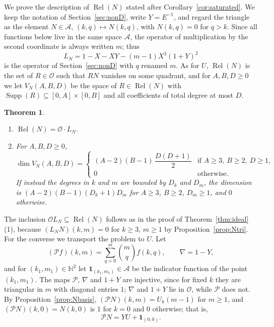 \documentclass[11pt]{amsart}
\newtheorem{theorem}{Theorem}[section]
\theoremstyle{definition}
\newcommand{\NN}{\mathbb{N}}
\newcommand{\cO}{\mathcal{O}}
\DeclareMathOperator{\Rel}{Rel}
\DeclareMathOperator{\Supp}{Supp}
\begin{document}
We prove the description of $\Rel(N)$ stated after Corollary~\ref{cor:saturated}. We keep the notation of Section~\ref{sec:nonD}, write $Y=E^{-1}$, and regard the triangle as the element $N\in\mathcal A$, $(k,q)\mapsto N(k,q)$, with $N(k,q)=0$ for $q>k$. Since all functions below live in the same space $\mathcal A$, the operator of multiplication by the second coordinate is always written $m$; thus
\[
  L_N=1-X-XY-(m-1)X^3(1+Y)^2
\]
is the operator of Section~\ref{sec:nonD} with $q$ renamed $m$. As for $U$, $\Rel(N)$ is the set of $R\in\cO$ such that $RN$ vanishes on some quadrant, and for $A,B,D\ge0$ we let $V_N(A,B,D)$ be the space of $R\in\Rel(N)$ with $\Supp(R)\subseteq[0,A]\times[0,B]$ and all coefficients of total degree at most $D$.

\begin{theorem}\label{thm:relN}\leavevmode
\begin{enumerate}
\item $\Rel(N)=\cO\cdot L_N$.
\item For $A,B,D\ge0$,
\[
  \dim V_N(A,B,D)=\begin{cases}(A-2)(B-1)\,\dfrac{D(D+1)}{2}&\text{if }A\ge3,\ B\ge2,\ D\ge1,\\[1ex] 0&\text{otherwise.}\end{cases}
\]
If instead the degrees in $k$ and $m$ are bounded by $D_k$ and $D_m$, the dimension is $(A-2)(B-1)(D_k+1)D_m$ for $A\ge3$, $B\ge2$, $D_m\ge1$, and $0$ otherwise.
\end{enumerate}
\end{theorem}

The inclusion $\cO L_N\subseteq\Rel(N)$ follows as in the proof of Theorem~\ref{thm:ideal}(1), because $(L_NN)(k,m)=0$ for $k\ge3$, $m\ge1$ by Proposition~\ref{prop:Ntri}. For the converse we transport the problem to $U$. Let
\[
  (\mathcal Pf)(k,m)=\sum_{q=0}^{m}\binom{m}{q}f(k,q),\qquad \nabla=1-Y,
\]
and for $(k_1,m_1)\in\NN^2$ let $\mathbf 1_{(k_1,m_1)}\in\mathcal A$ be the indicator function of the point $(k_1,m_1)$. The maps $\mathcal P$, $\nabla$ and $1+Y$ are injective, since for fixed $k$ they are triangular in $m$ with diagonal entries $1$; $\nabla$ and $1+Y$ lie in $\cO$, while $\mathcal P$ does not. By Proposition~\ref{prop:Nbasis}, $(\mathcal PN)(k,m)=U_k(m-1)$ for $m\ge1$, and $(\mathcal PN)(k,0)=N(k,0)$ is $1$ for $k=0$ and $0$ otherwise; that is,
\begin{equation}\label{eq:PN}
  \mathcal PN=YU+\mathbf 1_{(0,0)}.
\end{equation}
\end{document}
